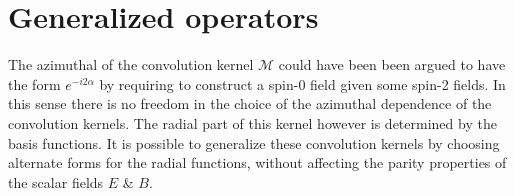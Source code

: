 \section{Generalized operators}
The azimuthal of the convolution kernel $\mathcal{M}$ could have been been argued to have the form $e^{-i2 \alpha}$ by requiring to construct a spin-0 field given some spin-2 fields. In this sense there is no freedom in the choice of the azimuthal dependence of the convolution kernels. The radial part of this kernel however is determined by the basis functions. It is possible to generalize these convolution kernels by choosing alternate forms for the radial functions, without affecting the parity properties of the scalar fields $E$ \& $B$.

